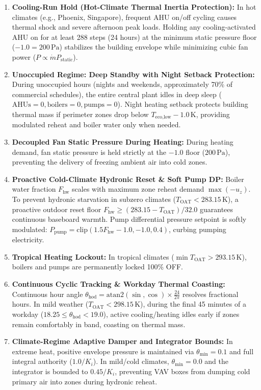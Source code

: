 \documentclass{article}
\begin{document}
\begin{enumerate}[leftmargin=*]
    \item \textbf{Cooling-Run Hold (Hot-Climate Thermal Inertia Protection):} In hot climates (e.g., Phoenix, Singapore), frequent AHU on/off cycling causes thermal shock and severe afternoon peak loads. Holding any cooling-activated AHU on for at least 288 steps (24 hours) at the minimum static pressure floor ($-1.0 = 200\,\text{Pa}$) stabilizes the building envelope while minimizing cubic fan power ($P \propto \dot{m} P_{\text{static}}$).
    \item \textbf{Unoccupied Regime: Deep Standby with Night Setback Protection:} During unoccupied hours (nights and weekends, approximately 70\% of commercial schedules), the entire central plant idles in deep sleep ($\text{AHUs} = 0, \text{boilers} = 0, \text{pumps} = 0$). Night heating setback protects building thermal mass if perimeter zones drop below $T_{\text{eco,low}} - 1.0\,\text{K}$, providing modulated reheat and boiler water only when needed.
    \item \textbf{Decoupled Fan Static Pressure During Heating:} During heating demand, fan static pressure is held strictly at the $-1.0$ floor ($200\,\text{Pa}$), preventing the delivery of freezing ambient air into cold zones.
    \item \textbf{Proactive Cold-Climate Hydronic Reset \& Soft Pump DP:} Boiler water fraction $F_{\text{hw}}$ scales with maximum zone reheat demand $\max(-u_z)$. To prevent hydronic starvation in subzero climates ($T_{\text{OAT}} < 283.15\,\text{K}$), a proactive outdoor reset floor $F_{\text{hw}} \ge (283.15 - T_{\text{OAT}})/32.0$ guarantees continuous baseboard warmth. Pump differential pressure setpoint is softly modulated: $P_{\text{pump}} = \text{clip}(1.5 F_{\text{hw}} - 1.0, -1.0, 0.4)$, curbing pumping electricity.
    \item \textbf{Tropical Heating Lockout:} In tropical climates ($\min T_{\text{OAT}} > 293.15\,\text{K}$), boilers and pumps are permanently locked 100\% OFF.
    \item \textbf{Continuous Cyclic Tracking \& Workday Thermal Coasting:} Continuous hour angle $\theta_{\text{hod}} = \text{atan2}(\sin, \cos) \times \frac{24}{2\pi}$ resolves fractional hours. In mild weather ($T_{\text{OAT}} < 298.15\,\text{K}$), during the final 45 minutes of a workday ($18.25 \le \theta_{\text{hod}} < 19.0$), active cooling/heating idles early if zones remain comfortably in band, coasting on thermal mass.
    \item \textbf{Climate-Regime Adaptive Damper and Integrator Bounds:} In extreme heat, positive envelope pressure is maintained via $\theta_{\min} = 0.1$ and full integral authority ($1.0/K_i$). In mild/cold climates, $\theta_{\min} = 0.0$ and the integrator is bounded to $0.45/K_i$, preventing VAV boxes from dumping cold primary air into zones during hydronic reheat.
\end{enumerate}
\end{document}
